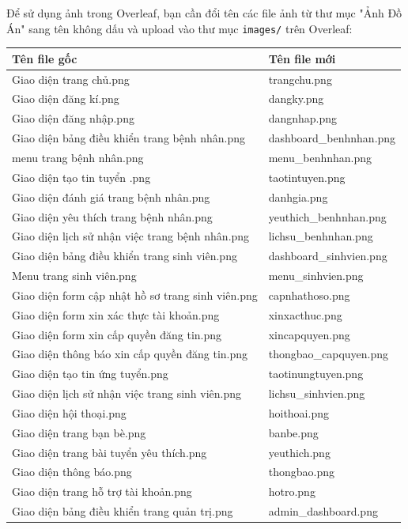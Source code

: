 \documentclass[a4paper,12pt]{report}
\begin{document}
Để sử dụng ảnh trong Overleaf, bạn cần đổi tên các file ảnh từ thư mục "Ảnh Đồ Án" sang tên không dấu và upload vào thư mục \texttt{images/} trên Overleaf:

\begin{table}[H]
\centering
\small
\begin{tabular}{|l|l|}
\hline
\textbf{Tên file gốc} & \textbf{Tên file mới} \\
\hline
Giao diện trang chủ.png & trangchu.png \\
Giao diện đăng kí.png & dangky.png \\
Giao diện đăng nhập.png & dangnhap.png \\
Giao diện bảng điều khiển trang bệnh nhân.png & dashboard\_benhnhan.png \\
menu trang bệnh nhân.png & menu\_benhnhan.png \\
Giao diện tạo tin tuyển .png & taotintuyen.png \\
Giao diện đánh giá trang bệnh nhân.png & danhgia.png \\
Giao diện yêu thích trang bệnh nhân.png & yeuthich\_benhnhan.png \\
Giao diện lịch sử nhận việc trang bệnh nhân.png & lichsu\_benhnhan.png \\
Giao diện bảng điều khiển trang sinh viên.png & dashboard\_sinhvien.png \\
Menu trang sinh viên.png & menu\_sinhvien.png \\
Giao diện form cập nhật hồ sơ trang sinh viên.png & capnhathoso.png \\
Giao diện form xin xác thực tài khoản.png & xinxacthuc.png \\
Giao diện form xin cấp quyền đăng tin.png & xincapquyen.png \\
Giao diện thông báo xin cấp quyền đăng tin.png & thongbao\_capquyen.png \\
Giao diện tạo tin ứng tuyển.png & taotinungtuyen.png \\
Giao diện lịch sử nhận việc trang sinh viên.png & lichsu\_sinhvien.png \\
Giao diện hội thoại.png & hoithoai.png \\
Giao diện trang bạn bè.png & banbe.png \\
Giao diện trang bài tuyển yêu thích.png & yeuthich.png \\
Giao diện thông báo.png & thongbao.png \\
Giao diện trang hỗ trợ tài khoản.png & hotro.png \\
Giao diện bảng điều khiển trang quản trị.png & admin\_dashboard.png \\

\end{tabular}
\end{table}
\end{document}
